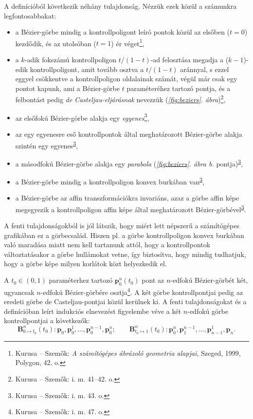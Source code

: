 \documentclass[12pt]{report}
\theoremstyle{definition}
\begin{document}
A definícióból következik néhány tulajdonság. Nézzük ezek közül a számunkra
legfontosabbakat:
\begin{itemize}[noitemsep,topsep=0pt]
  \item a Bézier-görbe mindig a kontrollpoligont leíró pontok közül az elsőben
  ($t=0$) kezdődik, és az utolsóban ($t=1$) ér véget\footnote{Kurusa -- Szemők:
  \emph{A számítógépes ábrázoló geometria alapjai}, Szeged, 1999, Polygon, 42.
  o.},
  \item a $k$-adik fokszámú kontrollpoligon $t/(1-t)$-ad felosztása megadja a
  ($k-1$)-edik kontrollpoligont, amit tovább osztva a $t/(1-t)$ aránnyal, s
  ezzel eggyel csökkentve a kontrollpoligon oldalainak számát, végül már csak
  egy pontot kapunk, ami a Bézier-görbe $t$ paraméteréhez tartozó pontja, és a
  felbontást pedig \emph{de Casteljau-eljárásnak} nevezzük
  (\emph{\ref{fig:beziers}. ábra})\footnote{Kurusa -- Szemők: i. m. 41--42.
  o.},
  \item az elsőfokú Bézier-görbe alakja egy \emph{egyenes}\footnote{Kurusa --
  Szemők: i. m. 43. o.\label{fn:Kurusa:43p}},
  \item az egy egyenesre eső kontrollpontok által meghatározott Bézier-görbe
  alakja szintén egy egyenes\textsuperscript{\ref{fn:Kurusa:43p}},

  \item a másodfokú Bézier-görbe alakja egy \emph{parabola}
  (\emph{\ref{fig:beziers}. ábra b.}
  pontja)\textsuperscript{\ref{fn:Kurusa:43p}},

  \item a Bézier-görbe mindig a kontrollpoligon konvex burkában
  van\textsuperscript{\ref{fn:Kurusa:43p}},

  \item a Bézier-görbe az affin transzformációkra invariáns, azaz a görbe affin
  képe megegyezik a kontrollpoligon affin képe által meghatározott
  Bézier-görbével\textsuperscript{\ref{fn:Kurusa:43p}}.
\end{itemize}

A fenti tulajdonságokból is jól látszik, hogy miért lett népszerű a
számítógépes grafikában ez a görbecsalád. Hiszen pl. a görbe kontrollpoligon
konvex burkában való maradása miatt nem kell tartanunk attól, hogy a
kontrollpontok változtatásakor a görbe hullámokat vetne, így biztosítva, hogy
mindig tudhatjuk, hogy a görbe képe milyen korlátok közt helyezkedik el.

A $t_0 \in (0,1)$ paraméterhez tartozó $\boldsymbol{p}^n_0(t_0)$ pont az
$n$-edfokú Bézier-görbét két, ugyancsak $n$-edfokú Bézier-görbére
osztja\footnote{Kurusa -- Szemők: i. m. 47. o.}. A két görbe kontrollpontjai
pedig az eredeti görbe de Casteljau-pontjai közül kerülnek ki. A fenti
tulajdonságokat és a definícióban leírt indukciós elnevezést figyelembe véve a
két $n$-edfokú görbe kontrollpontjai a következők: \begin{equation}\label{eq:1}
\boldsymbol{B}_{0\mapsto t_0}^n(t_0): \boldsymbol{p}_0, \boldsymbol{p}_0^1,
..., \boldsymbol{p}_0^{n-1}, \boldsymbol{p}_0^n; \qquad
\boldsymbol{B}_{t_0\mapsto 1}^n(t_0): \boldsymbol{p}_0^n,
\boldsymbol{p}_1^{n-1}, ..., \boldsymbol{p}_{n-1}^1, \boldsymbol{p}_n.
\end{equation}
\end{document}
